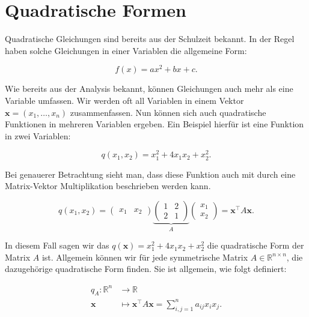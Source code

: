 \setcounter{section}{6}
\section{Quadratische Formen}

Quadratische Gleichungen sind bereits aus der Schulzeit bekannt. In der Regel haben solche Gleichungen in einer Variablen die allgemeine Form:

\begin{equation*}
    f(x) = ax^2 + bx + c.
\end{equation*}

Wie bereits aus der Analysis bekannt, können Gleichungen auch mehr als eine Variable umfassen. Wir werden oft all Variablen in einem Vektor \( \mathbf{x} = (x_1, \dots, x_n) \) zusammenfassen. Nun können sich auch quadratische Funktionen in mehreren Variablen ergeben. Ein Beispiel hierfür ist eine Funktion in zwei Variablen:

\begin{equation*}
    q(x_1,x_2) = x_1^2 + 4x_1x_2 + x_2^2.
\end{equation*}

Bei genauerer Betrachtung sieht man, dass diese Funktion auch mit durch eine Matrix-Vektor Multiplikation beschrieben werden kann. 

\begin{equation*}
    q(x_1, x_2) = \begin{pmatrix} x_1 & x_2 \end{pmatrix} \underbrace{\begin{pmatrix} 1 & 2 \\ 2 & 1 \end{pmatrix}}_{A} \begin{pmatrix} x_1 \\ x_2 \end{pmatrix} = \mathbf{x}^\top A \mathbf{x}.
\end{equation*}

In diesem Fall sagen wir das \( q(\mathbf{x}) = x_1^2 + 4x_1x_2 + x_2^2 \) die quadratische Form der Matrix \( A \) ist. Allgemein können wir für jede symmetrische Matrix \( A \in \mathbb{R}^{n \times n} \), die dazugehörige quadratische Form finden. Sie ist allgemein, wie folgt definiert:

\begin{equation*}
    \begin{aligned}
        q_A: \mathbb{R}^n &\longrightarrow \mathbb{R} \\
        \mathbf{x} &\longmapsto \mathbf{x}^\top A \mathbf{x} = \sum_{i,j=1}^{n} a_{ij}x_i x_j.
    \end{aligned}
\end{equation*}

